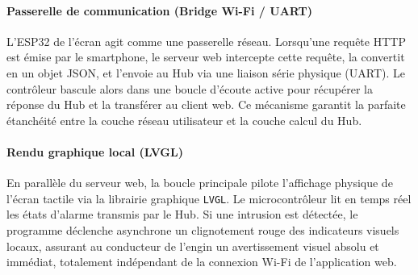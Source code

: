 \paragraph{Passerelle de communication (Bridge Wi-Fi / UART)}
L'ESP32 de l'écran agit comme une passerelle réseau. Lorsqu'une requête HTTP est émise par le smartphone, le serveur web intercepte cette requête, la convertit en un objet JSON, et l'envoie au Hub via une liaison série physique (UART). Le contrôleur bascule alors dans une boucle d'écoute active pour récupérer la réponse du Hub et la transférer au client web. Ce mécanisme garantit la parfaite étanchéité entre la couche réseau utilisateur et la couche calcul du Hub.

\paragraph{Rendu graphique local (LVGL)}
En parallèle du serveur web, la boucle principale pilote l'affichage physique de l'écran tactile via la librairie graphique \texttt{LVGL}. Le microcontrôleur lit en temps réel les états d'alarme transmis par le Hub. Si une intrusion est détectée, le programme déclenche asynchrone un clignotement rouge des indicateurs visuels locaux, assurant au conducteur de l'engin un avertissement visuel absolu et immédiat, totalement indépendant de la connexion Wi-Fi de l'application web.